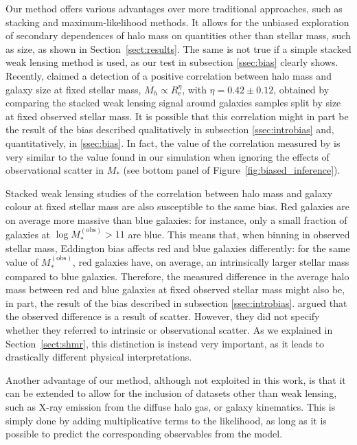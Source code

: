 \documentclass[usenatbib]{mnras}
\def\mobs{M_*^{\mathrm{(obs)}}}
\def\mstar{M_*}
\def\reff{R_{\mathrm{e}}}
\def\Sref#1{Section~\ref{#1}\xspace}
\def\Fref#1{Figure~\ref{#1}\xspace}
\begin{document}
Our method offers various advantages over more traditional approaches, such as stacking and maximum-likelihood methods.
It allows for the unbiased exploration of secondary dependences of halo mass on quantities other than stellar mass, such as size, as shown in \Sref{sect:results}.
The same is not true if a simple stacked weak lensing method is used, as our test in subsection \ref{ssec:bias} clearly shows.
Recently, \citet{Cha++17} claimed a detection of a positive correlation between halo mass and galaxy size at fixed stellar mass, $M_h \propto \reff ^ {\eta}$, with $\eta = 0.42\pm0.12$, obtained by comparing the stacked weak lensing signal around galaxies samples split by size at fixed observed stellar mass.
It is possible that this correlation might in part be the result of the bias described qualitatively in subsection \ref{ssec:introbias} and, quantitatively, in \ref{ssec:bias}. In fact, the value of the correlation measured by \citet{Cha++17} is very similar to the value found in our simulation when ignoring the effects of observational scatter in $\mstar$ (see bottom panel of \Fref{fig:biased_inference}).

Stacked weak lensing studies of the correlation between halo mass and galaxy colour at fixed stellar mass are also susceptible to the same bias.
Red galaxies are on average more massive than blue galaxies: for instance, only a small fraction of galaxies at $\log{\mobs} > 11$ are blue. This means that, when binning in observed stellar mass, Eddington bias affects red and blue galaxies differently: for the same value of $\mobs$, red galaxies have, on average, an intrinsically larger stellar mass compared to blue galaxies.
Therefore, the measured difference in the average halo mass between red and blue galaxies at fixed observed stellar mass \citep{Man++16} might also be, in part, the result of the bias described in subsection \ref{ssec:introbias}.
\citet{MNW17} argued that the observed difference %
is a result of scatter. However, they did not specify whether they referred to intrinsic or observational scatter. As we explained in \Sref{sect:shmr}, this distinction is instead very important, as it leads to drastically different physical interpretations.

Another advantage of our method, although not exploited in this work, is that it can be extended to allow for the inclusion of datasets other than weak lensing, such as X-ray emission from the diffuse halo gas, or galaxy kinematics.
This is simply done by adding multiplicative terms to the likelihood, as long as it is possible to predict the corresponding observables from the model.
\end{document}
